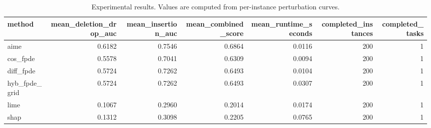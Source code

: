 \begin{table}[t]
\caption{Experimental results. Values are computed from per-instance perturbation curves.}
\label{tab:main_results_computed}
\centering
\begin{tabular}{lrrrrrr}
\toprule
method & mean\_deletion\_drop\_auc & mean\_insertion\_auc & mean\_combined\_score & mean\_runtime\_seconds & completed\_instances & completed\_tasks \\
\midrule
aime & 0.6182 & 0.7546 & 0.6864 & 0.0116 & 200 & 1 \\
cos\_fpde & 0.5578 & 0.7041 & 0.6309 & 0.0094 & 200 & 1 \\
diff\_fpde & 0.5724 & 0.7262 & 0.6493 & 0.0104 & 200 & 1 \\
hyb\_fpde\_grid & 0.5724 & 0.7262 & 0.6493 & 0.0307 & 200 & 1 \\
lime & 0.1067 & 0.2960 & 0.2014 & 0.0174 & 200 & 1 \\
shap & 0.1312 & 0.3098 & 0.2205 & 0.0765 & 200 & 1 \\
\bottomrule
\end{tabular}

\end{table}
